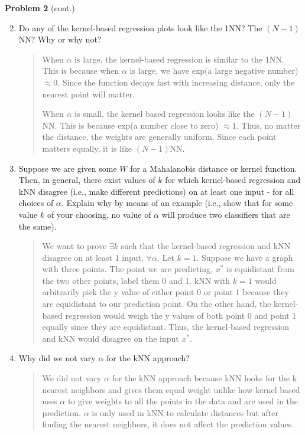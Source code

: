 \documentclass[submit]{harvardml}
\begin{document}
\newpage

\begin{framed}
\noindent\textbf{Problem 2} (cont.)\\
\begin{enumerate}
\setcounter{enumi}{1}
\item Do any of the kernel-based regression plots look like the 1NN?
  The $(N-1)$NN?  Why or why not?
  \begin{quote}
      When $\alpha$ is large, the kernel-based regression is similar to the 1NN. This is because when $\alpha$ is large, we have exp(a large negative number) $\approx 0$. Since the function decays fast with increasing distance, only the nearest point will matter.
      
      When $\alpha$ is small, the kernel based regression looks like the $(N-1)$NN. This is because exp(a number close to zero) $\approx 1$. Thus, no matter the distance, the weights are generally uniform. Since each point matters equally, it is like $(N-1)$NN.
  \end{quote}

\item Suppose we are given some $W$ for a Mahalanobis distance or
  kernel function.  Then, in general, there exist values of $k$ for which
  kernel-based regression and kNN disagree (i.e., make different predictions)
  on at least one input - for all choices of $\alpha$. Explain why by means of
  an example (i.e., show that for some value $k$ of your choosing,
  no value of $\alpha$ will produce two classifiers that are the same).
  
  \begin{quote}
      We want to prove $\exists k$ such that the kernel-based regression and kNN disagree on at least 1 input, $\forall \alpha$. Let $k=1$. Suppose we have a graph with three points. The point we are predicting, $x^*$ is equidistant from the two other points, label them 0 and 1. kNN with $k=1$ would arbitrarily pick the y value of either point 0 or point 1 because they are equidistant to our prediction point. On the other hand, the kernel-based regression would weigh the y values of both point 0 and point 1 equally since they are equidistant. Thus, the kernel-based regression and kNN would disagree on the input $x^*$.
  \end{quote}
    
\item Why did we not vary $\alpha$ for the kNN approach?    
    \begin{quote}
        We did not vary $\alpha$ for the kNN approach because kNN looks for the k nearest neighbors and gives them equal weight unlike how kernel based uses $\alpha$ to give weights to all the points in the data and are used in the prediction. $\alpha$ is only used in kNN to calculate distances but after finding the nearest neighbors, it does not affect the prediction values.
    \end{quote}
\end{enumerate}

\end{framed}
\end{document}
